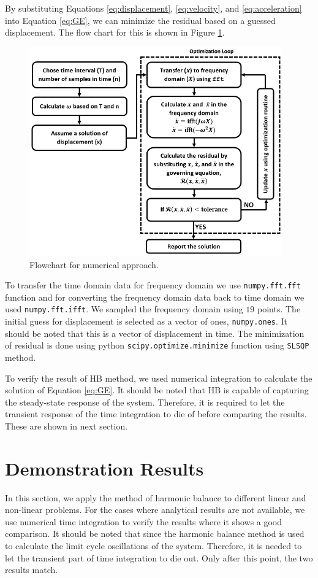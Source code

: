 \documentclass[12pt, a4paper]{extarticle}
\begin{document}
By substituting Equations \eqref{eq:displacement}, \eqref{eq:velocity}, and \eqref{eq:acceleration} into Equation \eqref{eq:GE}, we can minimize the residual based on a guessed displacement. The flow chart for this is shown in Figure \ref{fig:flowchart}.
%
\begin{figure}[h]
	\centering
	\includegraphics[height=9.00cm]{figure/minimize_residual.png}
	\caption{Flowchart for numerical approach.}
	\label{fig:flowchart}
\end{figure}
%

To transfer the time domain data for frequency domain we use \texttt{numpy.fft.fft} function and for converting the frequency domain data back to time domain we used \texttt{numpy.fft.ifft}. We sampled the frequency domain using $19$ points. The initial guess for displacement is selected as a vector of ones, \texttt{numpy.ones}. It should be noted that this is a vector of displacement in time. The minimization of residual is done using python \texttt{scipy.optimize.minimize} function using \texttt{SLSQP} method.

To verify the result of HB method, we used numerical integration to calculate the solution of Equation \eqref{eq:GE}. It should be noted that HB is capable of capturing the steady-state response of the system. Therefore, it is required to let the transient response of the time integration to die of before comparing the results. These are shown in next section.

\section{Demonstration Results}
In this section, we apply the method of harmonic balance to different linear and non-linear problems. For the cases where analytical results are not available, we use numerical time integration to verify the results where it shows a good comparison. It should be noted that since the harmonic balance method is used to calculate the limit cycle oscillations of the system. Therefore, it is needed to let the transient part of time integration to die out. Only after this point, the two results match.
\end{document}
